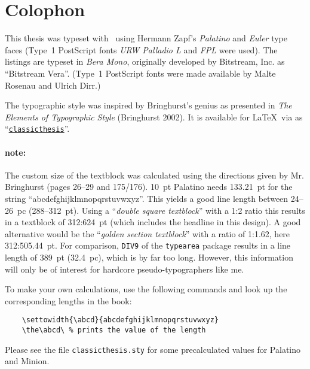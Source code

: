 \pagestyle{empty}

\hfill

\vfill


\section*{Colophon}
This thesis was typeset with \LaTeXe\ using Hermann Zapf's
\emph{Palatino}
and \emph{Euler} type faces (Type~1 PostScript fonts \emph{URW
Palladio L}
and \emph{FPL} were used). The listings are typeset in \emph{Bera
Mono}, originally developed by Bitstream, Inc. as ``Bitstream Vera''.
(Type~1 PostScript fonts were made available by Malte Rosenau and
Ulrich Dirr.)

The typographic style was inspired by Bringhurst's genius as
presented in \emph{The Elements of Typographic Style} 
(Bringhurst 2002). It is available for \LaTeX\ via  as 
``\href{http://www.ctan.org/tex-archive/macros/latex/contrib/classicthesis/}%
{\texttt{classicthesis}}''.

\paragraph{note:} The custom size of the textblock was calculated
using the directions given by Mr. Bringhurst (pages 26--29 and
175/176). 10~pt Palatino needs  133.21~pt for the string
``abcdefghijklmnopqrstuvwxyz''. This yields a good line length between
24--26~pc (288--312~pt). Using a ``\emph{double square textblock}''
with a 1:2 ratio this results in a textblock of 312:624~pt (which
includes the headline in this design). A good alternative would be the
``\emph{golden section textblock}'' with a ratio of 1:1.62, here
312:505.44~pt. For comparison, \texttt{DIV9} of the \texttt{typearea}
package results in a line length of 389~pt (32.4~pc), which is by far
too long. However, this information will only be of interest for
hardcore pseudo-typographers like me.%

To make your own calculations, use the following commands and look up
the corresponding lengths in the book:
\begin{verbatim}
    \settowidth{\abcd}{abcdefghijklmnopqrstuvwxyz}
    \the\abcd\ % prints the value of the length
\end{verbatim}
Please see the file \texttt{classicthesis.sty} for some precalculated 
values for Palatino and Minion.

    \settowidth{\abcd}{abcdefghijklmnopqrstuvwxyz}
    \the\abcd\ %


\bigskip

\noindent\finalVersionString



